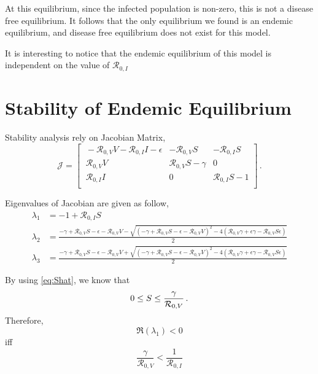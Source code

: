 \documentclass[12pt]{article}
\newcommand{\R}{\mathcal{R}}
\begin{document}
At this equilibrium, since the infected population is non-zero, this is not a disease free equilibrium. It follows that the only equilibrium we found is an endemic equilibrium, and disease free equilibrium does not exist for this model.

It is interesting to notice that the endemic equilibrium of this model is independent on the value of $\R_{0,I}$

\section{Stability of Endemic Equilibrium}\label{section5}

Stability analysis rely on Jacobian Matrix,
\begin{equation}
\mathcal{J} =
\begin{bmatrix}
    \ -\R_{0,V}V-\R_{0,I}I-\epsilon       & -\R_{0,V}S     &-\R_{0,I}S\\
    \ \R_{0,V}V       & \R_{0,V}S-\gamma    &0\\
    \ \R_{0,I}I       &0     &\R_{0,I} S-1\\
\end{bmatrix}\,.
\end{equation}

Eigenvalues of Jacobian are given as follow,
\begin{subequations}
\begin{align}
\lambda_1&=-1+\R_{0,I} S \label{eq:lambda1}\\
\lambda_2&=\frac{-\gamma+\R_{0,V}S-\epsilon-\R_{0,V}V-\sqrt{(-\gamma+\R_{0,V} S-\epsilon-\R_{0,V}V)^2-4(\R_{0,V}\gamma+\epsilon\gamma-\R_{0,V}S\epsilon)}}{2} \label{eq:lambda2}\\
\lambda_3&=\frac{-\gamma+\R_{0,V}S-\epsilon-\R_{0,V}V+\sqrt{(-\gamma+\R_{0,V} S-\epsilon-\R_{0,V}V)^2-4(\R_{0,V}\gamma+\epsilon\gamma-\R_{0,V}S\epsilon)}}{2}\label{eq:lambda3}
\end{align}
\end{subequations}

By using \autoref{eq:Shat}, we know that
\begin{equation}
0\leq S\leq \frac{\gamma}{\R_{0,V}}\,.{\label{middle}}
\end{equation}
Therefore, 
\begin{equation}
\Re(\lambda_1) <0
\end{equation}
iff 
\begin{equation}
\frac{\gamma}{\R_{0,V}}<\frac{1}{\R_{0,I}}
\end{equation}
\end{document}
